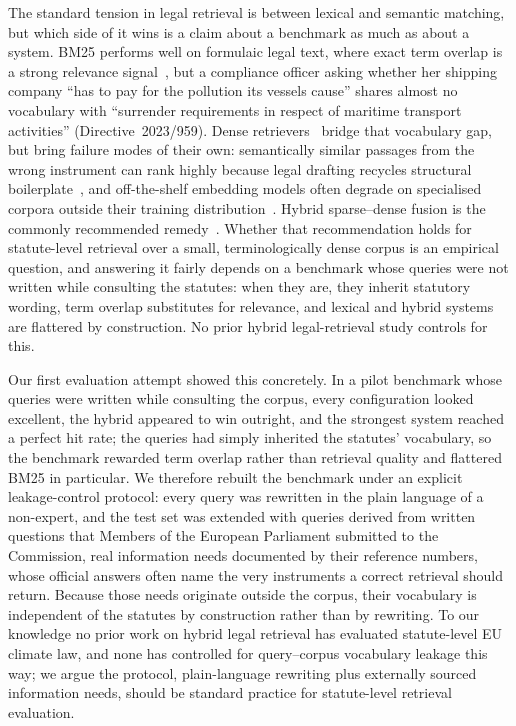 \documentclass[conference,a4paper]{IEEEtran}
\begin{document}
The standard tension in legal retrieval is between lexical and
semantic matching, but which side of it wins is a claim about a
benchmark as much as about a system.
BM25 performs well on formulaic legal text, where exact term overlap
is a strong relevance signal~\cite{1}, but a compliance officer asking
whether her shipping company ``has to pay for the pollution its
vessels cause'' shares almost no vocabulary with ``surrender
requirements in respect of maritime transport activities''
(Directive~2023/959).
Dense retrievers~\cite{19} bridge that vocabulary gap, but bring
failure modes of their own: semantically similar passages from the
wrong instrument can rank highly because legal drafting recycles
structural boilerplate~\cite{11}, and off-the-shelf embedding models
often degrade on specialised corpora outside their training
distribution~\cite{13,18}.
Hybrid sparse--dense fusion is the commonly recommended
remedy~\cite{2,3,9}.
Whether that recommendation holds for statute-level retrieval over a
small, terminologically dense corpus is an empirical question, and
answering it fairly depends on a benchmark whose queries were not
written while consulting the statutes: when they are, they inherit
statutory wording, term overlap substitutes for relevance, and
lexical and hybrid systems are flattered by construction.
No prior hybrid legal-retrieval study controls for this.

Our first evaluation attempt showed this concretely.
In a pilot benchmark whose queries were written while consulting the
corpus, every configuration looked excellent, the hybrid appeared to
win outright, and the strongest system reached a perfect hit rate;
the queries had simply inherited the statutes' vocabulary, so the
benchmark rewarded term overlap rather than retrieval quality and
flattered BM25 in particular.
We therefore rebuilt the benchmark under an explicit leakage-control
protocol: every query was rewritten in the plain language of a
non-expert, and the test set was extended with queries derived from
written questions that Members of the European Parliament submitted
to the Commission, real information needs documented by their
reference numbers, whose official answers often name the very
instruments a correct retrieval should return.
Because those needs originate outside the corpus, their vocabulary is
independent of the statutes by construction rather than by rewriting.
To our knowledge no prior work on hybrid legal retrieval has
evaluated statute-level EU climate law, and none has controlled for
query--corpus vocabulary leakage this way; we argue the protocol,
plain-language rewriting plus externally sourced information needs,
should be standard practice for statute-level retrieval evaluation.
\end{document}
